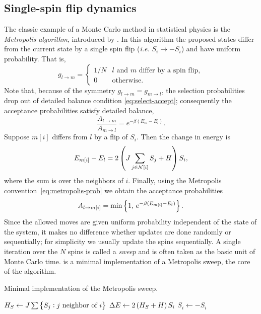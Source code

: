\subsection{Single-spin flip dynamics}

The classic example of a Monte Carlo method in statistical physics is the
\emph{Metropolis algorithm}, introduced by \textcite{metropolis1953equation}.
In this algorithm the proposed states differ from the current state by a single
spin flip (\emph{i.e.} $S_i \to -S_i$) and have uniform probability. That is,
\begin{equation}
  g_{l \to m} =
  \begin{cases}
    1/N & \text{$l$ and $m$ differ by a spin flip}, \\
    0   & \text{otherwise}.
  \end{cases}
\end{equation}
Note that, because of the symmetry $g_{l \to m} = g_{m \to l}$, the selection
probabilities drop out of detailed balance condition \eqref{eq:select-accept};
consequently the acceptance probabilities satisfy detailed balance,
\begin{equation}
  \frac{A_{l \to m}}{A_{m \to l}} = e^{-\beta(E_m - E_l)}.
\end{equation}
Suppose $m[i]$ differs from $l$ by a flip of $S_i$. Then the change in energy
is
\begin{equation}
  E_{m[i]} - E_l = 2 \left(J \sum_{j \in \mathcal{N}[i]} S_j + H\right) S_i,
\end{equation}
where the sum is over the neighbors of $i$. Finally, using the Metropolis
convention~\eqref{eq:metropolis-prob} we obtain the acceptance probabilities
\begin{equation}
  A_{l \to m[i]} = \min\cbr{1,\,e^{-\beta(E_{m[i]}-E_l)}}.
\end{equation}
Since the allowed moves are given uniform probability independent of the state
of the system, it makes no difference whether updates are done randomly or
sequentially; for simplicity we usually update the spins sequentially. A single
iteration over the $N$ spins is called a \emph{sweep} and is often taken as the
basic unit of Monte Carlo time.  is a minimal
implementation of a Metropolis sweep, the core of the algorithm.

\begin{algorithm}
\caption{Minimal implementation of the Metropolis sweep.}
\label{alg:metropolis}
\begin{algorithmic}
    \State $H_S \gets J \sum\cbr{S_j: \text{$j$ neighbor of $i$}}$
    \State $\Delta E \gets 2\left(H_S  + H\right) S_i$
      \State $S_i \gets -S_i$
    \EndIf
  \EndFor
\EndProcedure
\end{algorithmic}
\end{algorithm}


